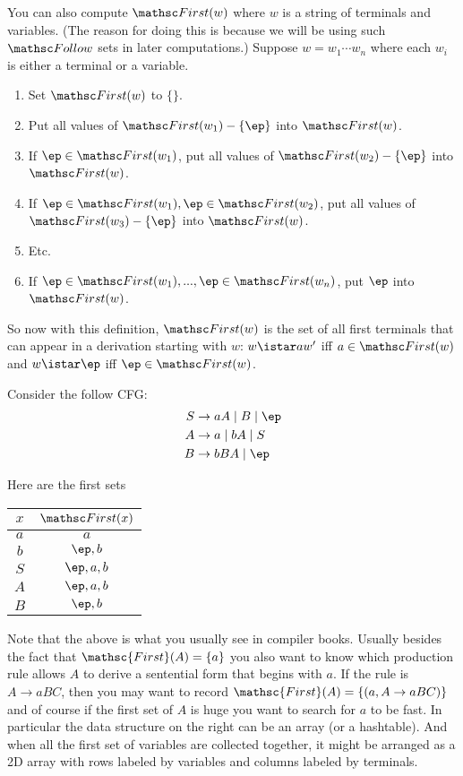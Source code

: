 You can also compute $\FIRST(w)$ where $w$ is a string of terminals and variables.
(The reason for doing this is because we will be using such $\FOLLOW$ sets
in later computations.)
Suppose $w = w_1 \cdots w_n$ where each $w_i$ is either a terminal or a variable. 
\begin{enumerate}[nosep]
\item Set $\FIRST(w)$ to $\{\}$.
\item Put all values of $\FIRST(w_1) - \{\ep\}$ into $\FIRST(w)$.
\item If $\ep \in \FIRST(w_1)$, put all values of $\FIRST(w_2) - \{\ep\}$ into $\FIRST(w)$.
\item If $\ep \in \FIRST(w_1), \ep\in\FIRST(w_2)$, put all values of $\FIRST(w_3) - \{\ep\}$ into $\FIRST(w)$.
\item Etc.
\item If $\ep \in \FIRST(w_1), ..., \ep\in\FIRST(w_n)$, put $\ep$ into $\FIRST(w)$.
\end{enumerate}
So now with this definition, $\FIRST(w)$ is the set of all first terminals that
can appear in a derivation starting with $w$:
$w \istar a w'$ iff $a \in \FIRST(w)$ and
$w \istar \ep$ iff $\ep \in \FIRST(w)$.



\begin{eg}
  Consider the follow CFG:
  \begin{align*}
    S &\rightarrow aA \mid B \mid \ep \\
    A &\rightarrow a \mid bA \mid S \\
    B &\rightarrow bBA \mid \ep
  \end{align*}
\end{eg}
Here are the first sets
{\small
\begin{longtable}{|cc|}
  \hline
  $x$ & $\FIRST(x)$  \\ \hline
  $a$ & $a$          \\
  $b$ & $\ep, b$     \\
  $S$ & $\ep,a,b$    \\
  $A$ & $\ep,a,b$    \\
  $B$ & $\ep,b$      \\ \hline
\end{longtable}
}
  
Note that the above is what you usually see in compiler books.
Usually besides the fact that $\mathsc{First}(A) = \{a\}$
you also want to know which production rule allows
$A$ to derive a sentential form that begins with $a$.
If the rule is
$A \rightarrow aBC$, then you may want to record
$\mathsc{First}(A) = \{(a, A \rightarrow aBC) \}$
and of course if the first set of $A$ is huge you want to search for
$a$ to be fast.
In particular the data structure on the right can be
an array (or a hashtable).
And when all the first set of variables are collected
together, it might be arranged as a 2D array
with rows labeled by variables and columns labeled by terminals.


